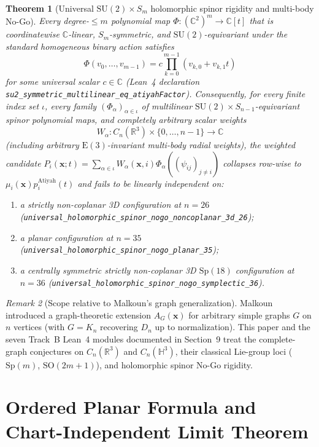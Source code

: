 \documentclass[11pt,reqno]{amsart}
\newtheorem{theorem}{Theorem}[section]
\theoremstyle{remark}
\newtheorem{remark}[theorem]{Remark}
\newcommand{\R}{\mathbb{R}}
\newcommand{\C}{\mathbb{C}}
\newcommand{\Hy}{\mathbb{H}}
\begin{document}
\begin{theorem}[Universal $\mathrm{SU}(2) \times S_m$ holomorphic spinor rigidity and multi-body No-Go]\label{thm:main-nogo}
Every degree-$\le m$ polynomial map $\Phi : (\C^2)^m \to \C[t]$ that is coordinatewise $\C$-linear, $S_m$-symmetric, and $\mathrm{SU}(2)$-equivariant under the standard homogeneous binary action satisfies
\[
  \Phi(v_0, \dots, v_{m-1}) = c \prod_{k=0}^{m-1} (v_{k,0} + v_{k,1} t)
\]
for some universal scalar $c \in \C$ (Lean~4 declaration \texttt{su2\_symmetric\_multilinear\_eq\_atiyahFactor}).
Consequently, for every finite index set $\iota$, every family $(\Phi_\alpha)_{\alpha \in \iota}$ of multilinear $\mathrm{SU}(2) \times S_{n-1}$-equivariant spinor polynomial maps, and completely arbitrary scalar weights
\[
  W_\alpha : C_n(\R^3) \times \{0, \dots, n - 1\} \to \C
\]
(including arbitrary $\mathrm{E}(3)$-invariant multi-body radial weights), the weighted candidate $P_i(\mathbf{x}; t) = \sum_{\alpha \in \iota} W_\alpha(\mathbf{x}, i) \Phi_\alpha((\psi_{ij})_{j \ne i})$ collapses row-wise to $\mu_i(\mathbf{x}) p_i^{\mathrm{Atiyah}}(t)$ and fails to be linearly independent on:
\begin{enumerate}
  \item a strictly non-coplanar 3D configuration at $n = 26$ (\texttt{universal\_holomorphic\_spinor\_nogo\_noncoplanar\_3d\_26});
  \item a planar configuration at $n = 35$ (\texttt{universal\_holomorphic\_spinor\_nogo\_planar\_35});
  \item a centrally symmetric strictly non-coplanar 3D $\mathrm{Sp}(18)$ configuration at $n = 36$ (\texttt{universal\_holomorphic\_spinor\_nogo\_symplectic\_36}).
\end{enumerate}
\end{theorem}

\begin{remark}[Scope relative to Malkoun's graph generalization]
Malkoun~\cite{Malkoun2025} introduced a graph-theoretic extension $A_G(\mathbf{x})$ for arbitrary simple graphs $G$ on $n$ vertices (with $G = K_n$ recovering $D_n$ up to normalization).
This paper and the seven Track~B Lean~4 modules documented in Section~9 treat the complete-graph conjectures on $C_n(\R^3)$ and $C_n(\Hy^3)$, their classical Lie-group loci ($\mathrm{Sp}(m)$, $\mathrm{SO}(2m+1)$), and holomorphic spinor No-Go rigidity.
\end{remark}

\section{Ordered Planar Formula and Chart-Independent Limit Theorem}
\end{document}

